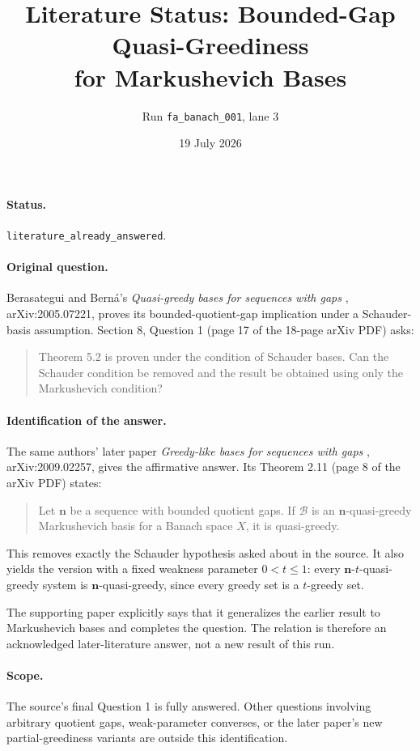 \documentclass[11pt]{article}
\title{Literature Status: Bounded-Gap Quasi-Greediness\\
for Markushevich Bases}
\author{Run \texttt{fa\_banach\_001}, lane 3}
\date{19 July 2026}
\begin{document}
\maketitle

\paragraph{Status.}
\texttt{literature\_already\_answered}.

\paragraph{Original question.}
Berasategui and Bern\'a's \emph{Quasi-greedy bases for sequences with gaps}
\cite{BB21}, arXiv:2005.07221, proves its bounded-quotient-gap implication
under a Schauder-basis assumption.  Section 8, Question 1 (page 17 of the
18-page arXiv PDF) asks:
\begin{quote}
Theorem 5.2 is proven under the condition of Schauder bases. Can the Schauder
condition be removed and the result be obtained using only the Markushevich
condition?
\end{quote}

\paragraph{Identification of the answer.}
The same authors' later paper \emph{Greedy-like bases for sequences with gaps}
\cite{BB24}, arXiv:2009.02257, gives the affirmative answer.  Its Theorem 2.11
(page 8 of the arXiv PDF) states:
\begin{quote}
Let $\mathbf n$ be a sequence with bounded quotient gaps. If $\mathcal B$ is
an $\mathbf n$-quasi-greedy Markushevich basis for a Banach space $X$, it is
quasi-greedy.
\end{quote}
This removes exactly the Schauder hypothesis asked about in the source.  It
also yields the version with a fixed weakness parameter $0<t\leq1$: every
$\mathbf n$-$t$-quasi-greedy system is $\mathbf n$-quasi-greedy, since every
greedy set is a $t$-greedy set.

The supporting paper explicitly says that it generalizes the earlier result
to Markushevich bases and completes the question.  The relation is therefore
an acknowledged later-literature answer, not a new result of this run.

\paragraph{Scope.}
The source's final Question 1 is fully answered.  Other questions involving
arbitrary quotient gaps, weak-parameter converses, or the later paper's new
partial-greediness variants are outside this identification.
\end{document}
